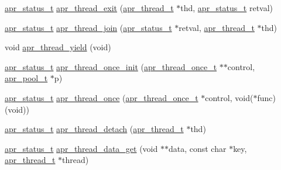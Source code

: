 \begin{DoxyCompactItemize}
\item 
\hyperlink{group__apr__errno_gaf76ee4543247e9fb3f3546203e590a6c}{apr\+\_\+status\+\_\+t} \hyperlink{group__apr__thread__proc_ga0e35365e530578bca1b4bea522ac8c85}{apr\+\_\+thread\+\_\+exit} (\hyperlink{group__apr__thread__proc_ga646c71351e723d84f8cc8c8d1d5937be}{apr\+\_\+thread\+\_\+t} $\ast$thd, \hyperlink{group__apr__errno_gaf76ee4543247e9fb3f3546203e590a6c}{apr\+\_\+status\+\_\+t} retval)
\item 
\hyperlink{group__apr__errno_gaf76ee4543247e9fb3f3546203e590a6c}{apr\+\_\+status\+\_\+t} \hyperlink{group__apr__thread__proc_ga1b950f36fa5bcd5a64887073f46f6d13}{apr\+\_\+thread\+\_\+join} (\hyperlink{group__apr__errno_gaf76ee4543247e9fb3f3546203e590a6c}{apr\+\_\+status\+\_\+t} $\ast$retval, \hyperlink{group__apr__thread__proc_ga646c71351e723d84f8cc8c8d1d5937be}{apr\+\_\+thread\+\_\+t} $\ast$thd)
\item 
void \hyperlink{group__apr__thread__proc_gacd69fb862c069cb6f297f65d64b5c102}{apr\+\_\+thread\+\_\+yield} (void)
\item 
\hyperlink{group__apr__errno_gaf76ee4543247e9fb3f3546203e590a6c}{apr\+\_\+status\+\_\+t} \hyperlink{group__apr__thread__proc_ga63f3bf667151053e45d5a2029daeda0d}{apr\+\_\+thread\+\_\+once\+\_\+init} (\hyperlink{group__apr__thread__proc_ga91841bcf20d0579e8e6acc6d3c220ac1}{apr\+\_\+thread\+\_\+once\+\_\+t} $\ast$$\ast$control, \hyperlink{group__apr__pools_gaf137f28edcf9a086cd6bc36c20d7cdfb}{apr\+\_\+pool\+\_\+t} $\ast$p)
\item 
\hyperlink{group__apr__errno_gaf76ee4543247e9fb3f3546203e590a6c}{apr\+\_\+status\+\_\+t} \hyperlink{group__apr__thread__proc_ga8f3645ee52ff07566c92181b4ce732d8}{apr\+\_\+thread\+\_\+once} (\hyperlink{group__apr__thread__proc_ga91841bcf20d0579e8e6acc6d3c220ac1}{apr\+\_\+thread\+\_\+once\+\_\+t} $\ast$control, void($\ast$func)(void))
\item 
\hyperlink{group__apr__errno_gaf76ee4543247e9fb3f3546203e590a6c}{apr\+\_\+status\+\_\+t} \hyperlink{group__apr__thread__proc_gadbd186912d5f6f2a19a175e1e02ba10e}{apr\+\_\+thread\+\_\+detach} (\hyperlink{group__apr__thread__proc_ga646c71351e723d84f8cc8c8d1d5937be}{apr\+\_\+thread\+\_\+t} $\ast$thd)
\item 
\hyperlink{group__apr__errno_gaf76ee4543247e9fb3f3546203e590a6c}{apr\+\_\+status\+\_\+t} \hyperlink{group__apr__thread__proc_gad799c8140ed068a12f1dbe134423eae7}{apr\+\_\+thread\+\_\+data\+\_\+get} (void $\ast$$\ast$data, const char $\ast$key, \hyperlink{group__apr__thread__proc_ga646c71351e723d84f8cc8c8d1d5937be}{apr\+\_\+thread\+\_\+t} $\ast$thread)

\end{DoxyCompactItemize}
